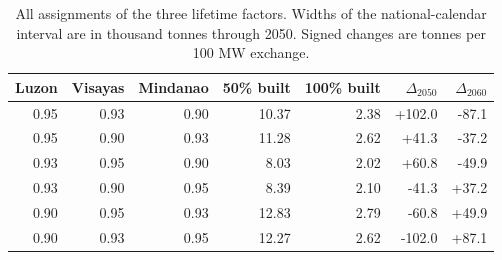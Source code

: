 \begin{table}[htbp]\centering\small
\caption{All assignments of the three lifetime factors. Widths of the national-calendar interval are in thousand tonnes through 2050. Signed changes are tonnes per 100 MW exchange.}\label{tab:ordering}
\begin{tabular}{rrrrrrr}\toprule
Luzon & Visayas & Mindanao & 50\% built & 100\% built & $\Delta_{2050}$ & $\Delta_{2060}$ \\
\midrule
0.95 & 0.93 & 0.90 & 10.37 & 2.38 & +102.0 & -87.1 \\
0.95 & 0.90 & 0.93 & 11.28 & 2.62 & +41.3 & -37.2 \\
0.93 & 0.95 & 0.90 & 8.03 & 2.02 & +60.8 & -49.9 \\
0.93 & 0.90 & 0.95 & 8.39 & 2.10 & -41.3 & +37.2 \\
0.90 & 0.95 & 0.93 & 12.83 & 2.79 & -60.8 & +49.9 \\
0.90 & 0.93 & 0.95 & 12.27 & 2.62 & -102.0 & +87.1 \\
\bottomrule\end{tabular}\end{table}
